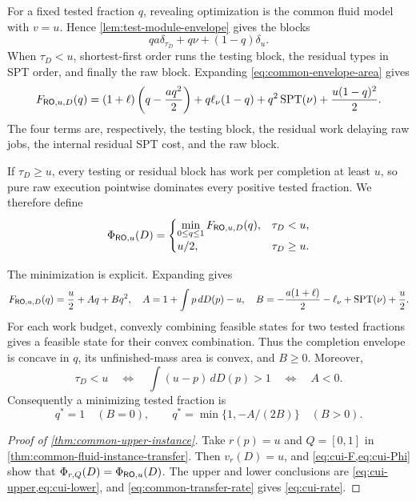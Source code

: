 For a fixed tested fraction $q$, revealing optimization is the common fluid
model with $v=u$.  Hence \cref{lem:test-module-envelope} gives the blocks
\[
 qa\delta_{\tau_D}+q\nu+(1-q)\delta_u.
\]
When $\tau_D<u$, shortest-first order runs the testing block, the residual
types in SPT order, and finally the raw block.  Expanding
\cref{eq:common-envelope-area} gives
\begin{equation}
 F_{\mathsf{RO},u,D}(q)
 =(1+\ell)\left(q-\frac{aq^2}{2}\right)
 +q\ell_\nu(1-q)+q^2\operatorname{SPT}(\nu)
 +\frac{u(1-q)^2}{2}.
 \label{eq:cui-F}
\end{equation}
The four terms are, respectively, the testing block, the residual work
delaying raw jobs, the internal residual SPT cost, and the raw block.

If $\tau_D\ge u$, every testing or residual block has work per completion at
least $u$, so pure raw execution pointwise dominates every positive tested
fraction.  We therefore define
\begin{equation}
 \Phi_{\mathsf{RO},u}(D)=
 \begin{cases}
  \displaystyle\min_{0\le q\le1}F_{\mathsf{RO},u,D}(q),&\tau_D<u,\\[3pt]
  u/2,&\tau_D\ge u.
 \end{cases}
 \label{eq:cui-Phi}
\end{equation}

The minimization is explicit.  Expanding gives
\begin{equation}
 F_{\mathsf{RO},u,D}(q)=\frac u2+Aq+Bq^2,
 \quad
 A=1+\int p\,dD(p)-u,
 \quad
 B=-\frac{a(1+\ell)}2-\ell_\nu+\operatorname{SPT}(\nu)+\frac u2.
 \label{eq:cui-quadratic}
\end{equation}
For each work budget, convexly combining feasible states for two tested
fractions gives a feasible state for their convex combination.  Thus the
completion envelope is concave in $q$, its unfinished-mass area is convex,
and $B\ge0$.  Moreover,
\[
 \tau_D<u
 \quad\Longleftrightarrow\quad
 \int(u-p)\,dD(p)>1
 \quad\Longleftrightarrow\quad A<0.
\]
Consequently a minimizing tested fraction is
\begin{equation}
 q^*=1\quad(B=0),
 \qquad
 q^*=\min\{1,-A/(2B)\}\quad(B>0).
 \label{eq:cui-qstar}
\end{equation}

\begin{proof}[Proof of \cref{thm:common-upper-instance}]
Take $r(p)=u$ and $Q=[0,1]$ in
\cref{thm:common-fluid-instance-transfer}.  Then
$v_r(D)=u$, and \cref{eq:cui-F,eq:cui-Phi} show that
$\Phi_{r,Q}(D)=\Phi_{\mathsf{RO},u}(D)$.  The upper and lower conclusions are
\cref{eq:cui-upper,eq:cui-lower}, and
\cref{eq:common-transfer-rate} gives \cref{eq:cui-rate}.
\end{proof}
